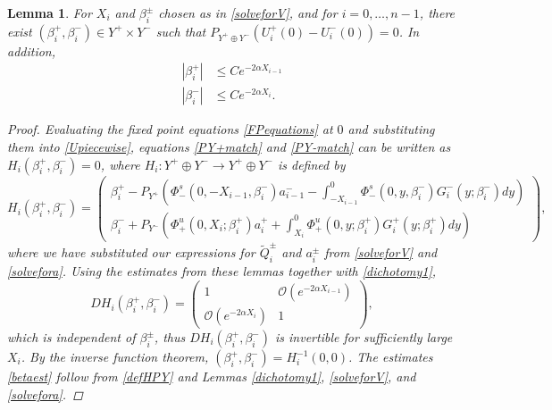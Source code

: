 \documentclass[12pt]{elsarticle}
\theoremstyle{plain}
\newtheorem{lemma}[theorem]{Lemma}
\theoremstyle{definition}
\theoremstyle{remark}
\numberwithin{theorem}{section}
\numberwithin{equation}{section}
\begin{document}
\begin{lemma}\label{solveforbeta}
For $X_i$ and $\beta_i^\pm$ chosen as in \cref{solveforV}, and for $i = 0, \dots, n-1$, there exist $(\beta_i^+, \beta_i^-) \in Y^+ \times Y^-$ such that $P_{Y^+ \oplus Y^-}(U_i^+(0) - U_i^-(0)) = 0$. In addition,
\begin{equation}\label{betaest}
\begin{aligned}
|\beta_i^+| &\leq C e^{-2 \alpha X_{i-1}} \\
|\beta_i^-| &\leq C e^{-2 \alpha X_i}.
\end{aligned}
\end{equation}
\begin{proof}
Evaluating the fixed point equations \cref{FPequations} at $0$ and substituting them into \cref{Upiecewise}, equations \cref{PY+match} and \cref{PY-match} can be written as $H_i(\beta_i^+, \beta_i^-) = 0$, where $H_i: Y^+ \oplus Y^- \rightarrow Y^+ \oplus Y^-$ is defined by
\begin{equation}\label{defHPY}
H_i(\beta_i^+, \beta_i^-) = 
\begin{pmatrix}
\beta_i^+ - P_{Y^+}\left(\Phi^s_-(0, -X_{i-1}, \beta_i^-) a_{i-1}^- 
- \int_{-X_{i-1}}^0 \Phi_-^s(0, y, \beta_i^-) G_i^-(y; \beta_i^-) dy\right) \\
\beta_i^- + P_{Y^-}\left( \Phi^u_+(0, X_i; \beta_i^+) a_i^+ 
+ \int_{X_i}^0 \Phi_+^u(0, y; \beta_i^+) G_i^+(y; \beta_i^+)dy \right)
\end{pmatrix},
\end{equation}
where we have substituted our expressions for $\tilde{Q}_i^\pm$ and $a_i^\pm$ from \cref{solveforV} and \cref{solvefora}. Using the estimates from these lemmas together with \cref{dichotomy1},
\begin{equation}\label{DHexp}
D H_i(\beta_i^+, \beta_i^-) = 
\begin{pmatrix}
1 & \mathcal{O}(e^{-2 \alpha X_{i-1}} ) \\
\mathcal{O}(e^{-2 \alpha X_i}) &  1 
\end{pmatrix},
\end{equation}
which is independent of $\beta_i^\pm$, thus $D H_i(\beta_i^+, \beta_i^-)$ is invertible for sufficiently large $X_i$. By the inverse function theorem, $(\beta_i^+, \beta_i^-) = H_i^{-1}(0, 0)$. The estimates \cref{betaest} follow from \cref{defHPY} and Lemmas \ref{dichotomy1}, \ref{solveforV}, and \ref{solvefora}.
\end{proof}
\end{lemma}
\end{document}
